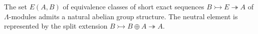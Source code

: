 The set $E(A, B)$ of equivalence classes of short exact sequences $B \rightarrowtail E \twoheadrightarrow A$ of $\Lambda$-modules admits a natural abelian group structure. The neutral element is represented by the split extension $B \rightarrowtail B \oplus A \twoheadrightarrow A$.
